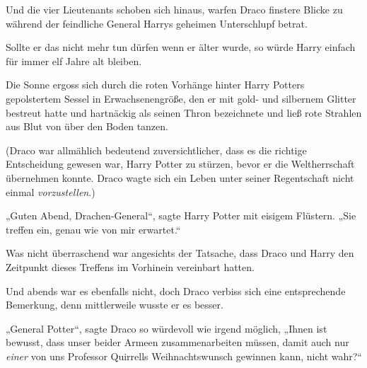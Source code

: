 Und die vier Lieutenants schoben sich hinaus, warfen Draco finstere Blicke zu während der feindliche General Harrys geheimen Unterschlupf betrat.

Sollte er das nicht mehr tun dürfen wenn er älter wurde, so würde Harry einfach für immer elf Jahre alt bleiben.

\later

Die Sonne ergoss sich durch die roten Vorhänge hinter Harry Potters gepolstertem Sessel in Erwachsenengröße, den er mit gold- und silbernem Glitter bestreut hatte und hartnäckig als seinen Thron bezeichnete und ließ rote Strahlen aus Blut von über den Boden tanzen.

(Draco war allmählich bedeutend zuversichtlicher, dass es die richtige Entscheidung gewesen war, Harry Potter zu stürzen, bevor er die Weltherrschaft übernehmen konnte. Draco wagte sich ein Leben unter seiner Regentschaft nicht einmal \emph{vorzustellen}.)

„Guten Abend, Drachen-General“, sagte Harry Potter mit eisigem Flüstern. „Sie treffen ein, genau wie von mir erwartet.“

Was nicht überraschend war angesichts der Tatsache, dass Draco und Harry den Zeitpunkt dieses Treffens im Vorhinein vereinbart hatten.

Und abends war es ebenfalls nicht, doch Draco verbiss sich eine entsprechende Bemerkung, denn mittlerweile wusste er es besser.

„General Potter“, sagte Draco so würdevoll wie irgend möglich, „Ihnen ist bewusst, dass unser beider Armeen zusammenarbeiten müssen, damit auch nur \emph{einer} von uns Professor Quirrells Weihnachtswunsch gewinnen kann, nicht wahr?“

